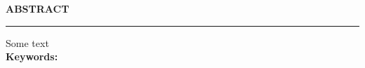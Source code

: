 \thispagestyle{empty}

\begin{center}
{\Large {\bf \uppercase{ABSTRACT}}}
\end{center}

\vspace{\baselineskip}
\hrule
\vspace{2\baselineskip}

\noindent Some text  \\ 
{\large \bf{Keywords}: }


